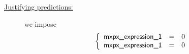 

\begin{description}
	\item[\underline{Justifying \hubMod{} predictions:}] 
		we impose
		\[
			\left\{ \begin{array}{lcl}
				\textsf{mxpx\_expression\_1} & = & 0 \\
				\textsf{mxpx\_expression\_1} & = & 0 \\
			\end{array} \right.
		\]
\end{description}
